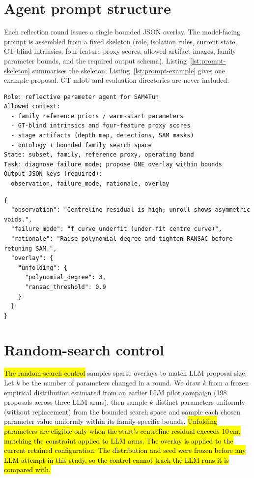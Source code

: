 \documentclass[a4paper,fleqn]{cas-dc}
\begin{document}
{\section{Agent prompt structure}\label{app:prompt}

Each reflection round issues a single bounded JSON overlay. The model-facing
prompt is assembled from a fixed skeleton (role, isolation rules, current
state, GT-blind intrinsics, four-feature proxy scores, allowed artifact images,
family parameter bounds, and the required output schema). Listing~\ref{lst:prompt-skeleton}
summarises the skeleton; Listing~\ref{lst:prompt-example} gives one example
proposal. GT mIoU and evaluation directories are never included.

\begin{lstlisting}[caption={Agent-prompt skeleton (per round).},label=lst:prompt-skeleton]
Role: reflective parameter agent for SAM4Tun
Allowed context:
  - family reference priors / warm-start parameters
  - GT-blind intrinsics and four-feature proxy scores
  - stage artifacts (depth map, detections, SAM masks)
  - ontology + bounded family search space
State: subset, family, reference proxy, operating band
Task: diagnose failure mode; propose ONE overlay within bounds
Output JSON keys (required):
  observation, failure_mode, rationale, overlay
\end{lstlisting}

\begin{lstlisting}[caption={Example JSON proposal returned by the agent.},label=lst:prompt-example]
{
  "observation": "Centreline residual is high; unroll shows asymmetric voids.",
  "failure_mode": "f_curve_underfit (under-fit centre curve)",
  "rationale": "Raise polynomial degree and tighten RANSAC before retuning SAM.",
  "overlay": {
    "unfolding": {
      "polynomial_degree": 3,
      "ransac_threshold": 0.9
    }
  }
}
\end{lstlisting}

\section{Random-search control}\label{app:random-search}

\hl{The random-search control} samples sparse overlays to match LLM proposal size. Let $k$ be the number of parameters changed in a round. We draw $k$ from a frozen empirical distribution estimated from an earlier LLM pilot campaign (198 proposals across three LLM arms), then sample $k$ distinct parameters uniformly (without replacement) from the bounded search space and sample each chosen parameter value uniformly within its family-specific bounds. \hl{Unfolding parameters are eligible only when the start's centreline residual exceeds 10\,cm, matching the constraint applied to LLM arms. The overlay is applied to the current retained configuration. The distribution and seed were frozen before any LLM attempt in this study, so the control cannot track the LLM runs it is compared with.}

}
\end{document}
